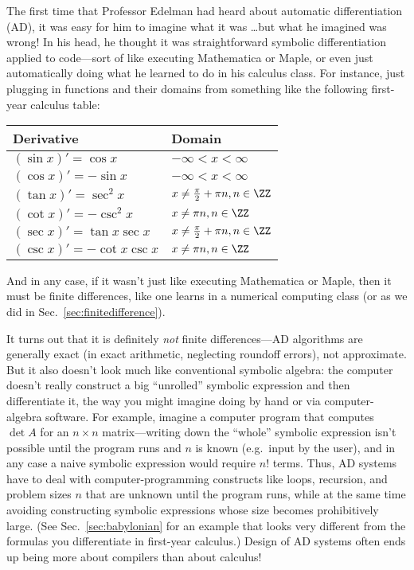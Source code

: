 The first time that Professor Edelman had heard about automatic differentiation (AD), it was easy for him to imagine what it was \ldots but what he imagined was wrong! In his head, he thought it was straightforward symbolic differentiation applied to code---sort of like executing Mathematica or Maple, or even just automatically doing what he learned to do in his calculus class. For instance, just plugging in functions and their domains from something like the following first-year calculus table:
\begin{table}[h]
\begin{center}
\begin{tabular}{|l|l|}
\hline
Derivative                    & Domain                                         \\ \hline
$(\sin x)' = \cos x$          & $- \infty< x < \infty$                   \\ \hline
$(\cos x)' = - \sin x$        & $-\infty< x < \infty$                    \\ \hline
$(\tan x)' = \sec^2 x$        & $x\neq \frac{\pi}{2} + \pi n, n \in \ZZ$ \\ \hline
$(\cot x)' = - \csc^2 x$      & $x\neq \pi n, n \in \ZZ$                 \\ \hline
$(\sec x)' = \tan x \sec x$   & $x \neq \frac{\pi}{2} + \pi n, n\in \ZZ$ \\ \hline
$(\csc x)' = - \cot x \csc x$ & $x\neq \pi n, n \in \ZZ$                 \\ \hline
\end{tabular}
\end{center}
\end{table}

\noindent And in any case, if it wasn't just like executing Mathematica or Maple, then  it must be finite differences, like one learns in a numerical computing class (or as we did in Sec.~\ref{sec:finitedifference}).

It turns out that it is definitely \emph{not} finite differences---AD algorithms are generally exact (in exact arithmetic, neglecting roundoff errors), not approximate.  But it also doesn't look much like conventional symbolic algebra: the computer doesn't really construct a big ``unrolled'' symbolic expression and then differentiate it, the way you might imagine doing by hand or via computer-algebra software.  For example, imagine a computer program that computes $\det A$ for an $n \times n$ matrix---writing down the ``whole'' symbolic expression isn't possible until the program runs and $n$ is known (e.g.~input by the user), and in any case a naive symbolic expression would require $n!$ terms.  Thus, AD systems have to deal with computer-programming constructs like loops, recursion, and problem sizes $n$ that are unknown until the program runs, while at the same time avoiding constructing symbolic expressions whose size becomes prohibitively large.  (See Sec.~\ref{sec:babylonian} for an example that looks very different from the formulas you differentiate in first-year calculus.)  Design of AD systems often ends up being more about compilers than about calculus!



